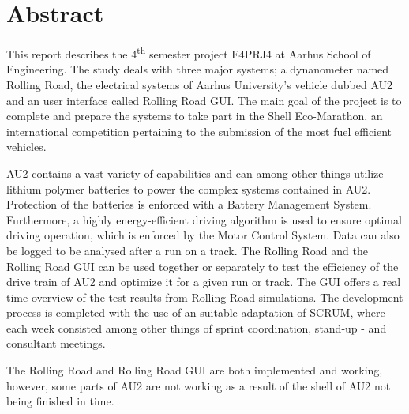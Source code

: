 \chapter{Abstract}
This report describes the 4\textsuperscript{th} semester project E4PRJ4 at Aarhus School of Engineering. The study deals with three major systems; a dynanometer named Rolling Road, the electrical systems of Aarhus University's vehicle dubbed AU2 and an user interface called Rolling Road GUI. The main goal of the project is to complete and prepare the systems to take part in the Shell Eco-Marathon, an international competition pertaining to the submission of the most fuel efficient vehicles. 

AU2 contains a vast variety of capabilities and can among other things utilize lithium polymer batteries to power the complex systems contained in AU2.
Protection of the batteries is enforced with a Battery Management System. Furthermore, a highly energy-efficient driving algorithm is used to ensure optimal driving operation, which is enforced by the Motor Control System. Data can also be logged to be analysed after a run on a track.
The Rolling Road and the Rolling Road GUI can be used together or separately to test the efficiency of the drive train of AU2 and optimize it for a given run or track. The GUI offers a real time overview of the test results from Rolling Road simulations.
The development process is completed with the use of an suitable adaptation of SCRUM, where each week consisted among other things of sprint coordination, stand-up - and consultant meetings.

The Rolling Road and Rolling Road GUI are both implemented and working, however, some parts of AU2 are not working as a result of the shell of AU2 not being finished in time.